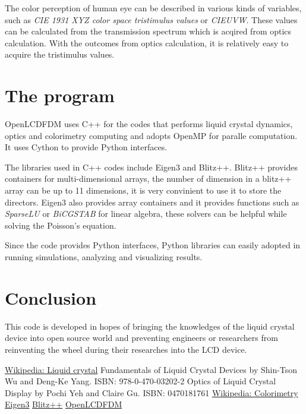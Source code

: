 \documentclass[11pt, a4paper]{article} %
\begin{document}
\begin{multicols}{2}
The color perception of human eye can be described in various kinds of variables, such as \emph{CIE 1931 XYZ color space tristimulus values} or \emph{CIEUVW}\cite{wiki_colorimetry}. These values can be calculated from the transmission spectrum which is acqired from optics calculation. With the outcomes from optics calculation, it is relatively easy to acquire the tristimulus values.

\section{The program}
OpenLCDFDM uses C++ for the codes that performs liquid crystal dynamics, optics and colorimetry computing and adopts OpenMP for paralle computation. It uses Cython to provide Python interfaces. 

The libraries used in C++ codes include Eigen3\cite{libeigen} and Blitz++\cite{blitz}. Blitz++ provides containers for multi-dimensional arrays, the number of dimension in a blitz++ array can be up to 11 dimensions, it is very convinient to use it to store the directors. Eigen3 also provides array containers and it provides functions such as \emph{SparseLU} or \emph{BiCGSTAB} for linear algebra, these solvers can be helpful while solving the Poisson's equation.

Since the code provides Python interfaces, Python libraries can easily adopted in running simulations, analyzing and visualizing results.

\section{Conclusion}
This code is developed in hopes of bringing the knowledges of the liquid crystal device into open source world and preventing engineers or researchers from reinventing the wheel during their researches into the LCD device.

\begin{thebibliography}{7}
\href{http://en.wikipedia.org/wiki/Liquid_crystal}{Wikipedia: Liquid crystal}
Fundamentals of Liquid Crystal Devices by Shin-Tson Wu and Deng-Ke Yang. ISBN: 978-0-470-03202-2
Optics of Liquid Crystal Display by Pochi Yeh and Claire Gu. ISBN: 0470181761
\href{http://en.wikipedia.org/wiki/Colorimetry}{Wikipedia: Colorimetry}
\href{http://eigen.tuxfamily.org/index.php?title=Main_Page}{Eigen3}
\href{http://sourceforge.net/projects/blitz/}{Blitz++}
\href{https://github.com/xingularity/OpenLCDFDM}{OpenLCDFDM}
\end{thebibliography}
\end{multicols}
\end{document}
